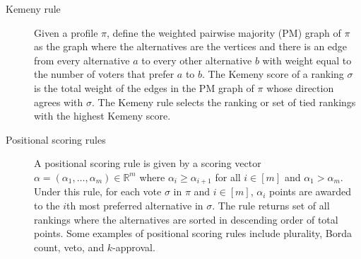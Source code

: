 \documentclass[prodmode,acmec]{ec-acmsmall}
\newcommand{\calL}{{\mathcal{L}}}
\newcommand{\rank}{{\calL(A)}}
\newcommand{\kibitz}[2]{\ifnum\Comments=1\textcolor{#1}{#2}\fi}
\newcommand{\ns}[1]{\kibitz{red} {[NS: #1]}}
\begin{document}
\begin{description}
\item[Kemeny rule] Given a profile $\pi$, define the weighted pairwise majority (PM) graph of $\pi$ as the graph where the alternatives are the vertices and there is an edge from every alternative $a$ to every other alternative $b$ with weight equal to the number of voters that prefer $a$ to $b$. The Kemeny score of a ranking $\sigma$ is the total weight of the edges in the PM graph of $\pi$ whose direction agrees with $\sigma$. The Kemeny rule selects the ranking or set of tied rankings with the highest Kemeny score.\\

\item[Positional scoring rules] A positional scoring rule is given by a scoring vector $\alpha = (\alpha_1,\ldots,\alpha_m) \in \mathbb{R}^m$ where $\alpha_i \ge \alpha_{i+1}$ for all $i \in [m]$ and $\alpha_1 > \alpha_m$. Under this rule, for each vote $\sigma$ in $\pi$ and $i \in [m]$, $\alpha_i$ points are awarded to the $i${th} most preferred alternative in $\sigma$. The rule returns set of all rankings where the alternatives are sorted in descending order of total points. Some examples of positional scoring rules include plurality, Borda count, veto, and $k$-approval.
\end{description}



\end{document}
